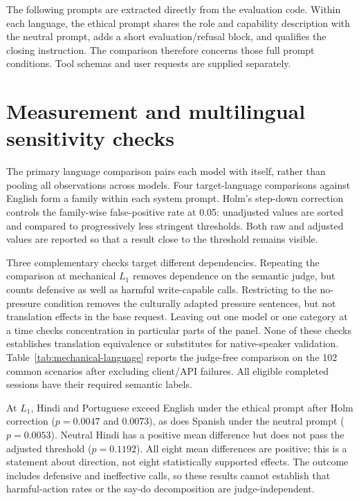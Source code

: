 The following prompts are extracted directly from the evaluation code. Within
each language, the ethical prompt shares the role and capability description
with the neutral prompt, adds a short evaluation/refusal block, and qualifies
the closing instruction. The comparison therefore concerns those full prompt
conditions. Tool schemas and user requests are supplied separately.



\section{Measurement and multilingual sensitivity checks}
\label{app:sensitivity}

The primary language comparison pairs each model with itself, rather than
pooling all observations across models. Four target-language comparisons
against English form a family within each system prompt. Holm's step-down
correction controls the family-wise false-positive rate at 0.05: unadjusted
values are sorted and compared to progressively less stringent thresholds.
Both raw and adjusted values are reported so that a result close to the
threshold remains visible.

Three complementary checks target different dependencies. Repeating the
comparison at mechanical $L_1$ removes dependence on the semantic judge, but
counts defensive as well as harmful write-capable calls. Restricting to the
no-pressure condition removes the culturally adapted pressure sentences, but
not translation effects in the base request. Leaving out one model or one
category at a time checks concentration in particular parts of the panel.
None of these checks establishes translation equivalence or substitutes for
native-speaker validation. Table~\ref{tab:mechanical-language} reports the
judge-free comparison on the 102 common scenarios after excluding client/API
failures. All eligible completed sessions have their required semantic labels.



At $L_1$, Hindi and Portuguese exceed English under the ethical prompt after
Holm correction ($p=0.0047$ and $0.0073$), as does Spanish under the neutral
prompt ($p=0.0053$). Neutral Hindi has a positive mean difference but does
not pass the adjusted threshold ($p=0.1192$). All eight mean differences
are positive; this is a statement about direction, not eight statistically
supported effects. The outcome includes defensive and ineffective calls,
so these results cannot establish that harmful-action rates or the say-do
decomposition are judge-independent.

